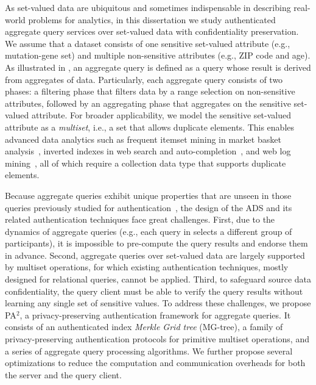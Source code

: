 As set-valued data are ubiquitous and sometimes indispensable in describing real-world problems for analytics, in this dissertation we study authenticated aggregate query services over set-valued data with confidentiality preservation. We assume that a dataset consists of one sensitive set-valued attribute (e.g., mutation-gene set) and multiple non-sensitive attributes (e.g., ZIP code and age). As illustrated in , an aggregate query is defined as a query whose result is derived from aggregates of data. Particularly, each aggregate query consists of two phases: a filtering phase that filters data by a range selection on non-sensitive attributes, followed by an aggregating phase that aggregates on the sensitive set-valued attribute. For broader applicability, we model the sensitive set-valued attribute as a \emph{multiset}, i.e., a set that allows duplicate elements. This enables advanced data analytics such as frequent itemset mining in market basket analysis~\cite{Agrawal:1994:FAM:645920.672836}, inverted indexes in web search and auto-completion~\cite{10.1145/1148170.1148234}, and web log mining~\cite{10.14778/2212351.2212353}, all of which require a collection data type that supports duplicate elements.

Because aggregate queries exhibit unique properties that are unseen in those queries previously studied for authentication~\cite{10.1109/ICDE.2004.1320027,10.1145/1142473.1142488,10.1007/s00778-008-0113-2}, the design of the ADS and its related authentication techniques face great challenges. First, due to the dynamics of aggregate queries (e.g., each query in  selects a different group of participants), it is impossible to pre-compute the query results and endorse them in advance. Second, aggregate queries over set-valued data are largely supported by multiset operations, for which existing authentication techniques, mostly designed for relational queries, cannot be applied. Third, to safeguard  source data confidentiality, the query client must be able to verify the query results without learning any single set of sensitive values. To address these challenges, we propose PA$^2$, a privacy-preserving authentication framework for aggregate queries. It consists of an authenticated index \emph{Merkle Grid tree} (MG-tree), a family of privacy-preserving authentication protocols for primitive multiset operations, and a series of aggregate query processing algorithms. We further propose several optimizations to reduce the computation and communication overheads for both the server and the query client.

